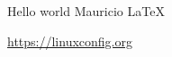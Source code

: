 \documentclass{article}
\begin{document}
Hello world Mauricio \LaTeX

\url{https://linuxconfig.org}
\end{document}
